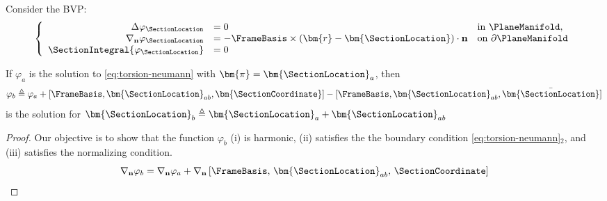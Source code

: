 \begin{proposition}[Relocation]
    Consider the BVP:
    \begin{equation}
    \left\{
    \begin{array}{rll}
    \Delta \varphi_{\SectionLocation} &=0 & \mathrm{in }\ \PlaneManifold, \\
    \nabla_{\mathbf{n}} \varphi_{\SectionLocation}  &=-\FrameBasis \times (\bm{r}-\bm{\SectionLocation}) \cdot \mathbf{n} & \mathrm{ on }\ \partial \PlaneManifold  \\
    \SectionIntegral{\varphi_{\SectionLocation}} &= 0
    \end{array}
    \right.
    \label{eq:torsion-neumann}
    \end{equation}

    If \(\varphi_a\) is the solution to \eqref{eq:torsion-neumann} with \(\bm{\pi} = \bm{\SectionLocation}_a\), then 
    \[
    \varphi_{b} \triangleq \varphi_a + [\FrameBasis, \bm{\SectionLocation}_{ab}, \bm{\SectionCoordinate}] - [\FrameBasis, \bm{\SectionLocation}_{ab},  \bar{\bm{\SectionLocation}}] %
    \]
    is the solution for \(\bm{\SectionLocation}_{b} \triangleq \bm{\SectionLocation}_a + \bm{\SectionLocation}_{ab}\)
\end{proposition}
\begin{proof}
Our objective is to show that the function \(\varphi_b\) (i) is harmonic, (ii) satisfies the the boundary condition \eqref{eq:torsion-neumann}$_2$, and (iii) satisfies the normalizing condition.
\begin{equation*}
\nabla_{\mathbf{n}}\varphi_b = \nabla_{\mathbf{n}}\varphi_a + \nabla_{\mathbf{n}}\left[\FrameBasis,\, \bm{\SectionLocation}_{ab},\, \SectionCoordinate \right]
\end{equation*}

\end{proof}
